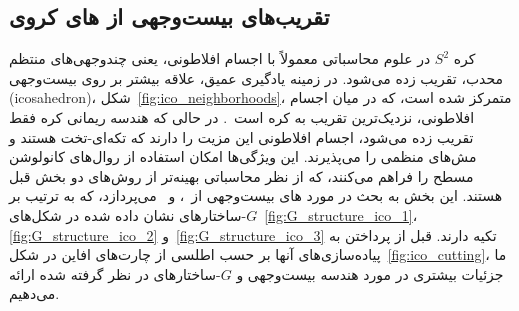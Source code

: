 

\subsection{تقریب‌های بیست‌وجهی از های کروی}
\label{sec:spherical_CNNs_icosahedral}

کره $S^2$ در علوم محاسباتی معمولاً با اجسام افلاطونی، یعنی چندوجهی‌های منتظم محدب، تقریب زده می‌شود.
در زمینه یادگیری عمیق، علاقه بیشتر بر روی بیست‌وجهی (icosahedron)، شکل~\ref{fig:ico_neighborhoods}، متمرکز شده است، که در میان اجسام افلاطونی، نزدیک‌ترین تقریب به کره است~\cite{schroder1995spherical}.
در حالی که هندسه ریمانی کره فقط تقریب زده می‌شود، اجسام افلاطونی این مزیت را دارند که تکه‌ای-تخت هستند و مش‌های منظمی را می‌پذیرند.
این ویژگی‌ها امکان استفاده از روال‌های کانولوشن مسطح را فراهم می‌کنند، که از نظر محاسباتی بهینه‌تر از روش‌های دو بخش قبل هستند.
این بخش به بحث در مورد های بیست‌وجهی از~\cite{liu2018icoAltAz}، \cite{zhang2019orientation} و~\cite{gaugeIco2019} می‌پردازد، که به ترتیب بر $G$-ساختارهای نشان داده شده در شکل‌های~\ref{fig:G_structure_ico_1}، \ref{fig:G_structure_ico_2} و~\ref{fig:G_structure_ico_3} تکیه دارند.
قبل از پرداختن به پیاده‌سازی‌های آنها بر حسب اطلسی از چارت‌های افاین در شکل~\ref{fig:ico_cutting}،
ما جزئیات بیشتری در مورد هندسه بیست‌وجهی و $G$-ساختارهای در نظر گرفته شده ارائه می‌دهیم.


